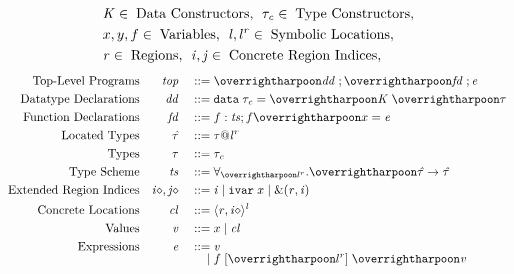 \begin{displaymath}
  \begin{aligned}
  &\mathit{K} \in \; \textup{Data Constructors},\:\: \mathit{\tau_c} \in \; \textup{Type Constructors},\\
  &x, y,f \in \; \textup{Variables},\:\:
  \mathit{l}, {l}^{r} \in \; \textup{Symbolic Locations},\\
  &\mathit{r} \in \; \textup{Regions},\:\: \mathit{i}, \mathit{j} \in \; \textup{Concrete Region Indices},
  \end{aligned}
\end{displaymath}
\begin{displaymath}
  \begin{aligned}
    \textup{Top-Level Programs} && \PROG && \gramdef & \overharpoon{\DD} \;; \overharpoon{\FD} \;; \EXPR \\
    \textup{Datatype Declarations} && \DD && \gramdef & \DATA\;\TYPC = \overharpoon{\DC \; \overharpoon{\sTYP}\;} \\
    \textup{Function Declarations} && \FD && \gramdef & \fvar : \TS ; \fvar \overharpoon{\var} = \EXPR \\
    \textup{Located Types} && \hTYP && \gramdef & \tyatlocreg{\TYP}{\loc}{\reg} \\
    \textup{Types} && \TYP && \gramdef & \TYPC \\
    \textup{Type Scheme} && \TS && \gramdef &
      \forall _{\overharpoon{\locreg{l}{r}}}.
      \overharpoon{\hTYP} \ARROW \hTYP \\
      \textup{Extended Region Indices} && \indbef{\ind}, \indbef{\indj} && \gramdef & \concreteind{\ind} \gramor \indivar{\ivarid} \gramor \indirection{\reg}{\concreteind{\ind}} \\
    \textup{Concrete Locations} && \concretelocvar{} && \gramdef & \concreteloc{\reg}{\indbef{\ind}}{\loc}\\
    \textup{Values} && \VAL && \gramdef & \var \gramor \concretelocvar{}\\
    \textup{Expressions} && \EXPR && \gramdef & \VAL\\[-5pt]
    && && \gramor & \fapp{\overharpoon{\locreg{l}{r}}}{\overharpoon{\VAL}} \\

\end{aligned}
\end{displaymath}
